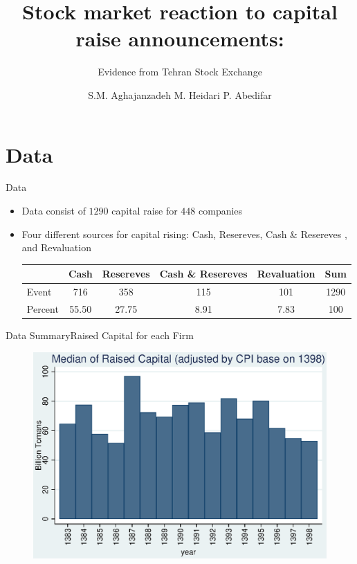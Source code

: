 \documentclass{beamer}
\title[Capital Raise]{Stock market reaction to capital raise announcements:}
\subtitle{Evidence from Tehran Stock Exchange}
\author[Aghajanzadeh, Heidari \&Abedifar]{S.M. Aghajanzadeh \qquad M. Heidari \qquad P. Abedifar }
\institute[]{Tehran Institute for Advanced Studies }
\begin{document}
{\maketitle}

\section{Data}
\begin{frame}{Data}
\begin{itemize}
\item Data consist of $1290$ capital raise for $448$ companies 

\item Four different sources for capital rising: Cash, Resereves, Cash \& Resereves , and Revaluation \\

\begin{table}[htbp]
  \centering
\label{t1}
\resizebox{0.7\textwidth}{!}
{
    \begin{tabular}{lccccc}
    \hline
    \hline
          & \multicolumn{1}{l}{Cash} & \multicolumn{1}{c}{Resereves} & \multicolumn{1}{c}{Cash \& Resereves} & \multicolumn{1}{c}{Revaluation} &  \multicolumn{1}{c}{Sum} \\
          \hline
    Event & 716   & 358   & 115   & 101   & 1290 \\
Percent & 55.50 & 27.75 & 8.91  & 7.83  & 100 \\
    \hline\hline
    \end{tabular}
    }
  \label{tab:addlabel}
  
\end{table}%


\end{itemize}

\end{frame}






\begin{frame}{Data Summary}{Raised Capital for each Firm}
\begin{figure}
\centering
\includegraphics[width=0.7\linewidth]{MedianCapRaiseAdjusted.eps}
\label{fig:mediancapraise}
\end{figure}
\end{frame}
\end{document}
